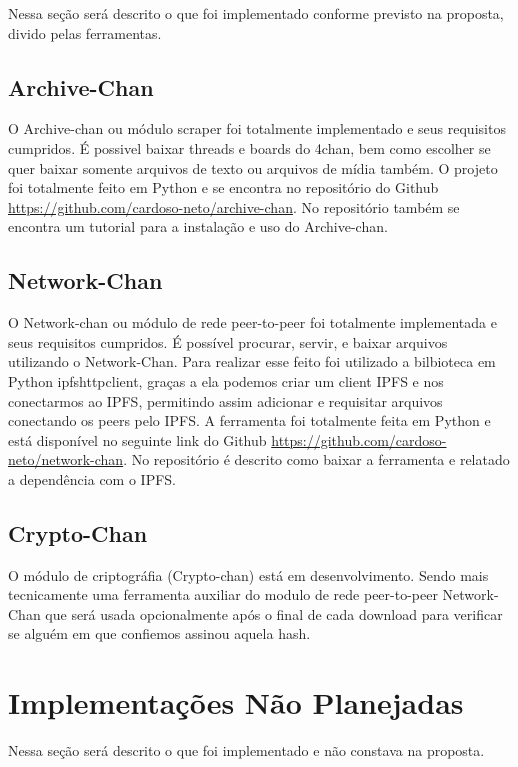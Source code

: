 Nessa seção será descrito o que foi implementado conforme previsto na proposta, divido pelas ferramentas.

\subsection{Archive-Chan}

O Archive-chan ou módulo scraper foi totalmente implementado e seus requisitos cumpridos.
É possivel baixar threads e boards do 4chan, bem como escolher se quer baixar somente arquivos de texto ou arquivos de mídia também.
O projeto foi totalmente feito em Python e se encontra no repositório do Github \url{https://github.com/cardoso-neto/archive-chan}.
No repositório também se encontra um tutorial para a instalação e uso do Archive-chan.

\subsection{Network-Chan}

O Network-chan ou módulo de rede peer-to-peer foi totalmente implementada e seus requisitos cumpridos.
É possível procurar, servir, e baixar arquivos utilizando o Network-Chan.
Para realizar esse feito foi utilizado a bilbioteca em Python ipfshttpclient, graças a ela podemos criar um client IPFS e nos conectarmos ao IPFS, permitindo assim adicionar e requisitar arquivos conectando os peers pelo IPFS.
A ferramenta foi totalmente feita em Python e está disponível no seguinte link do Github \url{https://github.com/cardoso-neto/network-chan}.
No repositório é descrito como baixar a ferramenta e relatado a dependência com o IPFS.

\subsection{Crypto-Chan}

O módulo de criptográfia (Crypto-chan) está em desenvolvimento.
Sendo mais tecnicamente uma ferramenta auxiliar do modulo de rede peer-to-peer Network-Chan que será usada opcionalmente após o final de cada download para verificar se alguém em que confiemos assinou aquela hash.

\section{Implementações Não Planejadas}

Nessa seção será descrito o que foi implementado e não constava na proposta.

